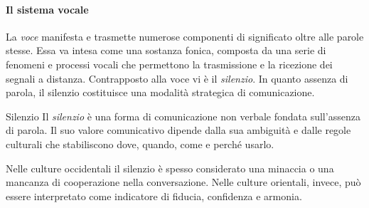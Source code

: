 \documentclass[a4paper]{article}
\begin{document}
\paragraph{Il sistema vocale}
La \emph{voce} manifesta e trasmette numerose componenti di significato oltre alle parole stesse. Essa va intesa come una sostanza fonica, composta da una serie di fenomeni e processi vocali che permettono la trasmissione e la ricezione dei segnali a distanza.
Contrapposto alla voce vi è il \emph{silenzio}. In quanto assenza di parola, il silenzio costituisce una modalità strategica di comunicazione.
\begin{snippetdefinition}{Silenzio}
    Il \emph{silenzio} è una forma di comunicazione non verbale fondata sull'assenza di parola. Il suo valore comunicativo dipende dalla sua ambiguità e dalle regole culturali che stabiliscono dove, quando, come e perché usarlo.
\end{snippetdefinition}
Nelle culture occidentali il silenzio è spesso considerato una minaccia o una mancanza di cooperazione nella conversazione. Nelle culture orientali, invece, può essere interpretato come indicatore di fiducia, confidenza e armonia.
\end{document}
